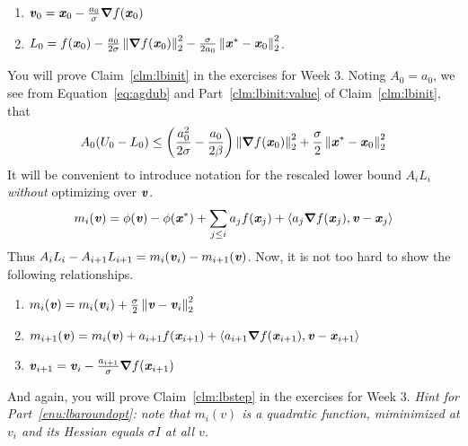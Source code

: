 \newpage

 \begin{claim}
   \label{clm:lbinit}
   \noindent
   \begin{enumerate}
   \item $\boldsymbol{\mathit{v}}_0 = \boldsymbol{\mathit{x}}_0 - \frac{a_0}{\sigma} \boldsymbol{\nabla} f(\boldsymbol{\mathit{x}}_0)$
   \item
     \label{clm:lbinit:value}
     $L_0 = f(\boldsymbol{\mathit{x}}_0) - \frac{a_0}{2\sigma} \left\| \boldsymbol{\nabla} f(\boldsymbol{\mathit{x}}_0)
      \right\|_2^2 - \frac{\sigma }{2 a_0}\left\|  \boldsymbol{\mathit{x}}^* - \boldsymbol{\mathit{x}}_0 \right\|_2^2 $.
\end{enumerate}
\end{claim}
You will prove Claim~\ref{clm:lbinit} in the exercises for Week 3.
Noting $A_0 = a_0$,
we see from Equation~\eqref{eq:agdub} and Part~\ref{clm:lbinit:value}
of Claim~\ref{clm:lbinit}, that
\begin{align}
  \label{eq:gapinit}
  A_0( U_0 - L_0 ) \leq
  \left(
  \frac{a_0^2}{2\sigma}
  -
    \frac{a_0}{2\beta}
  \right)
  \left\| \boldsymbol{\nabla} f(\boldsymbol{\mathit{x}}_0) \right\|_2^2
    +
    \frac{\sigma }{2}\left\|  \boldsymbol{\mathit{x}}^* - \boldsymbol{\mathit{x}}_0 \right\|_2^2
\end{align}
It will be convenient to introduce notation for the
rescaled lower bound $A_iL_i$ \emph{without} optimizing over $\boldsymbol{\mathit{v}}$.
\[
  m_i(\boldsymbol{\mathit{v}}) =
  \phi(\boldsymbol{\mathit{v}})
   - \phi(\boldsymbol{\mathit{x}}^*)
  +
  \sum_{j \leq i} a_j  f(\boldsymbol{\mathit{x}}_j)
    + \left<  a_j\boldsymbol{\nabla}
      f(\boldsymbol{\mathit{x}}_{j}) ,\boldsymbol{\mathit{v}} - \boldsymbol{\mathit{x}}_j \right>
  \]
Thus $A_iL_i-A_{i+1}L_{i+1} = m_{i}(\boldsymbol{\mathit{v}}_i) - m_{i+1}(\boldsymbol{\mathit{v}})$.
Now, it is not too hard to show the
following relationships.
\begin{claim}
  \label{clm:lbstep}
   \noindent
   \begin{enumerate}
   \item
     \label{enu:lbaroundopt}
     $ m_{i}(\boldsymbol{\mathit{v}}) = m_{i}(\boldsymbol{\mathit{v}}_i) + \frac{\sigma}{2} \left\|  \boldsymbol{\mathit{v}} -
   \boldsymbol{\mathit{v}}_i \right\|_2^2$
   \item  $m_{i+1}(\boldsymbol{\mathit{v}}) = m_{i}(\boldsymbol{\mathit{v}})
     + a_{i+1}  f(\boldsymbol{\mathit{x}}_{i+1})
     + \left<  a_{i+1}\boldsymbol{\nabla}
      f(\boldsymbol{\mathit{x}}_{i+1}) ,\boldsymbol{\mathit{v}} - \boldsymbol{\mathit{x}}_{i+1} \right>$
  \item  $\boldsymbol{\mathit{v}}_{i+1} = \boldsymbol{\mathit{v}}_i -  \frac{a_{i+1}}{\sigma} \boldsymbol{\nabla} f(\boldsymbol{\mathit{x}}_{i+1})$
   \end{enumerate}
 \end{claim}
And again, you will prove Claim~\ref{clm:lbstep} in the exercises for
Week 3.
\emph{Hint for Part~\ref{enu:lbaroundopt}: note that $m_i(v)$ is a quadratic function, miminimized at $v_i$ and
  its Hessian equals $\sigma I$ at all $v$.}

